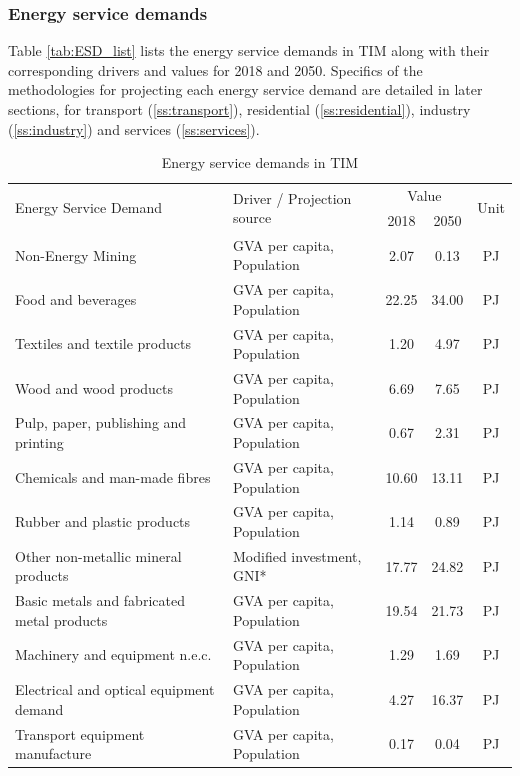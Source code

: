 \documentclass[gmd,manuscript]{copernicus}
\begin{document}
\subsubsection{Energy service demands}
Table \ref{tab:ESD_list} lists the energy service demands in TIM along with their corresponding drivers and values for 2018 and 2050. Specifics of the methodologies for projecting each energy service demand are detailed in later sections, for transport (\ref{ss:transport}), residential (\ref{ss:residential}), industry (\ref{ss:industry}) and services (\ref{ss:services}). 

\begin{table}[htbp]
\footnotesize
 \centering
 \caption{Energy service demands in TIM}
 \begin{tabular}{llccc}
 \hline
    \multirow{2}[0]{*}{Energy Service Demand} & \multirow{2}[0]{*}{Driver / Projection source} & \multicolumn{2}{c}{Value} & \multirow{2}[0]{*}{Unit} \\
          &       & \multicolumn{1}{c}{2018} & \multicolumn{1}{c}{2050} &  \\ \hline
    Non-Energy Mining  & GVA per capita, Population & 2.07  & 0.13  & PJ \\
    Food and beverages  & GVA per capita, Population & 22.25 & 34.00 & PJ \\
    Textiles and textile products  & GVA per capita, Population & 1.20  & 4.97  & PJ \\
    Wood and wood products  & GVA per capita, Population & 6.69  & 7.65  & PJ \\
    Pulp, paper, publishing and printing  & GVA per capita, Population & 0.67  & 2.31  & PJ \\
    Chemicals and man-made fibres  & GVA per capita, Population & 10.60 & 13.11 & PJ \\
    Rubber and plastic products  & GVA per capita, Population & 1.14  & 0.89  & PJ \\
    Other non-metallic mineral products  & Modified investment, GNI* & 17.77 & 24.82 & PJ \\
    Basic metals and fabricated metal products  & GVA per capita, Population & 19.54 & 21.73 & PJ \\
    Machinery and equipment n.e.c.  & GVA per capita, Population & 1.29  & 1.69  & PJ \\
    Electrical and optical equipment demand & GVA per capita, Population & 4.27  & 16.37 & PJ \\
    Transport equipment manufacture  & GVA per capita, Population & 0.17  & 0.04  & PJ \\

\end{tabular}
\end{table}
\end{document}
